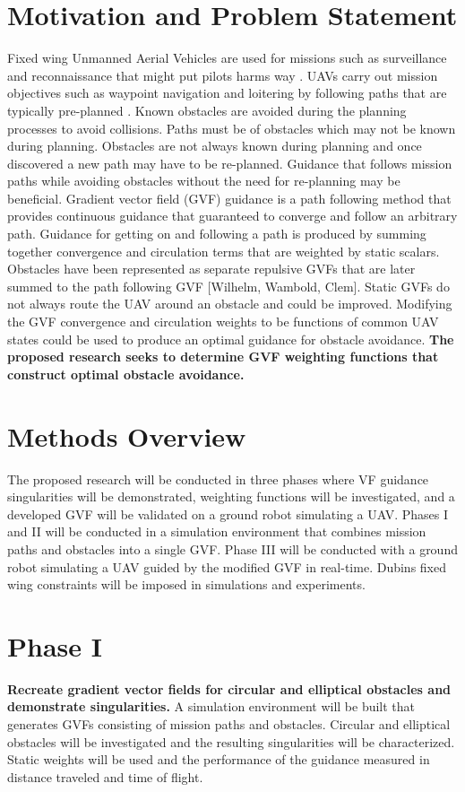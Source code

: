 \documentclass[numbered,pdftex]{ohio-etd}
\begin{document}
\section{Motivation and Problem Statement}
 Fixed wing Unmanned Aerial Vehicles are used for  missions such as surveillance and reconnaissance that might put pilots harms way \cite{bone_uavs_2003}. UAVs carry out mission objectives such as waypoint navigation and loitering by following paths that are typically pre-planned \cite{sujit_unmanned_2014}. Known obstacles are avoided during the planning processes to avoid collisions. Paths must be of obstacles which may not be known during planning. Obstacles are not always known during planning and once discovered a new path may have to be re-planned. Guidance that follows mission paths while avoiding obstacles without the need for re-planning may be beneficial. Gradient vector field (GVF) guidance is a path following method that provides continuous guidance that guaranteed to converge and follow an arbitrary path. Guidance for getting on and following a path is produced by summing together convergence and circulation terms that are weighted by static scalars. Obstacles have been represented as separate repulsive GVFs that are later summed to the path following GVF [Wilhelm, Wambold, Clem]. Static GVFs do not always route the UAV around an obstacle and could be improved. Modifying the GVF convergence and circulation weights to be functions of common UAV states could be used to produce an optimal guidance for obstacle avoidance. \textbf{The proposed research seeks to determine GVF weighting functions that construct optimal obstacle avoidance.}
 \pagebreak
 
 
 
\section{Methods Overview}
The proposed research will be conducted in three phases where VF guidance  singularities will be demonstrated, weighting functions will be investigated, and a developed GVF will be validated on a ground robot simulating a UAV.  Phases I and II will be conducted in a simulation environment that combines mission paths and obstacles into a single GVF. Phase III will be conducted with a ground robot simulating a UAV guided by the modified GVF in real-time. Dubins fixed wing constraints will be imposed in simulations and experiments. 


\section{Phase I}
\textbf{Recreate gradient vector fields for circular and elliptical obstacles and demonstrate singularities.} A simulation environment will be built that generates GVFs consisting of mission paths and obstacles. Circular and elliptical obstacles will be investigated and the resulting singularities will be characterized. Static weights will be used and the performance of the guidance measured in distance traveled and time of flight. 
\end{document}
